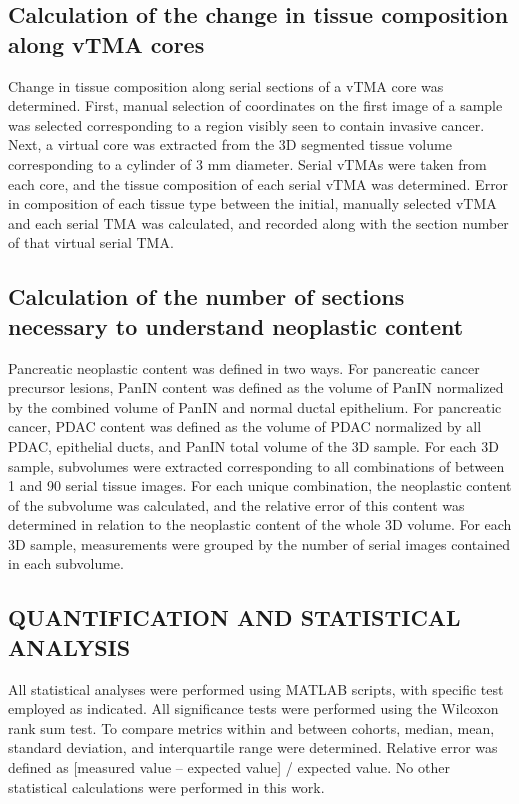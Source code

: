 \begin{refsection}
    \subsection{Calculation of the change in tissue composition along vTMA cores}
    Change in tissue composition along serial sections of a vTMA core was determined. First, manual selection of coordinates on the first image of a sample was selected corresponding to a region visibly seen to contain invasive cancer. Next, a virtual core was extracted from the 3D segmented tissue volume corresponding to a cylinder of 3 mm diameter. Serial vTMAs were taken from each core, and the tissue composition of each serial vTMA was determined. Error in composition of each tissue type between the initial, manually selected vTMA and each serial TMA was calculated, and recorded along with the section number of that virtual serial TMA. 
    
    \subsection{Calculation of the number of sections necessary to understand neoplastic content}
    Pancreatic neoplastic content was defined in two ways. For pancreatic cancer precursor lesions, PanIN content was defined as the volume of PanIN normalized by the combined volume of PanIN and normal ductal epithelium. For pancreatic cancer, PDAC content was defined as the volume of PDAC normalized by all PDAC, epithelial ducts, and PanIN total volume of the 3D sample. For each 3D sample, subvolumes were extracted corresponding to all combinations of between 1 and 90 serial tissue images. For each unique combination, the neoplastic content of the subvolume was calculated, and the relative error of this content was determined in relation to the neoplastic content of the whole 3D volume. For each 3D sample, measurements were grouped by the number of serial images contained in each subvolume.
    
    
    
    \subsection{QUANTIFICATION AND STATISTICAL ANALYSIS}
    All statistical analyses were performed using MATLAB scripts, with specific test employed as indicated. All significance tests were performed using the Wilcoxon rank sum test. To compare metrics within and between cohorts, median, mean, standard deviation, and interquartile range were determined. Relative error was defined as [measured value – expected value] / expected value. No other statistical calculations were performed in this work.
    
    \par
    \printbibliography[heading=subbibliography, title={References}]
\end{refsection}